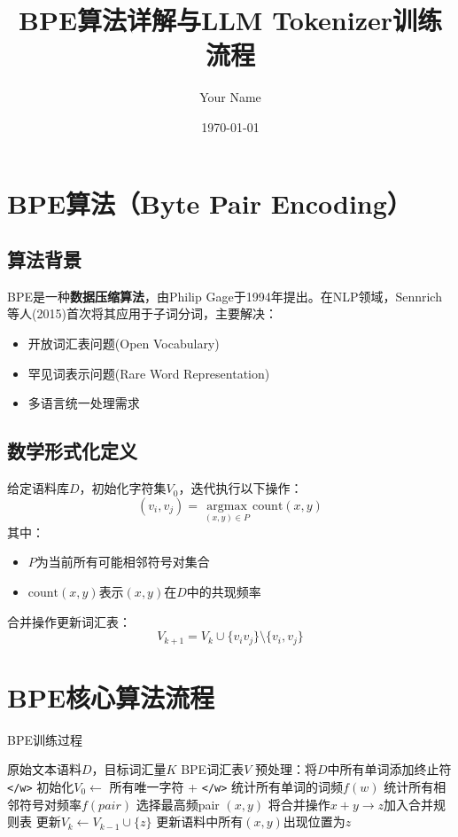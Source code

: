 \documentclass{article}
\title{BPE算法详解与LLM Tokenizer训练流程}
\author{Your Name}
\date{\today}
\begin{document}
\maketitle

\section{BPE算法（Byte Pair Encoding）}
\subsection{算法背景}
BPE是一种\textbf{数据压缩算法}，由Philip Gage于1994年提出。在NLP领域，Sennrich等人(2015)首次将其应用于子词分词，主要解决：
\begin{itemize}
    \item 开放词汇表问题(Open Vocabulary)
    \item 罕见词表示问题(Rare Word Representation)
    \item 多语言统一处理需求
\end{itemize}

\subsection{数学形式化定义}
给定语料库$D$，初始化字符集$V_0$，迭代执行以下操作：
\[
(v_i, v_j) = \mathop{\arg\max}\limits_{(x,y) \in P} \text{count}(x,y)
\]
其中：
\begin{itemize}
    \item $P$为当前所有可能相邻符号对集合
    \item $\text{count}(x,y)$表示$(x,y)$在$D$中的共现频率
\end{itemize}
合并操作更新词汇表：
\[
V_{k+1} = V_k \cup \{v_i v_j\} \setminus \{v_i, v_j\}
\]

\section{BPE核心算法流程}
\begin{algorithm}[H]
\caption{BPE训练过程}
\begin{algorithmic}[1]
\Require 原始文本语料$D$，目标词汇量$K$
\Ensure BPE词汇表$V$
\State 预处理：将$D$中所有单词添加终止符\texttt{</w>}
\State 初始化$V_0 \gets$ 所有唯一字符 + \texttt{</w>}
\State 统计所有单词的词频$f(w)$
    \State 统计所有相邻符号对频率$f(pair)$
    \State 选择最高频pair $(x,y)$
    \State 将合并操作$x + y \rightarrow z$加入合并规则表
    \State 更新$V_k \gets V_{k-1} \cup \{z\}$
    \State 更新语料中所有$(x,y)$出现位置为$z$
\EndFor
\end{algorithmic}
\end{algorithm}
\end{document}
